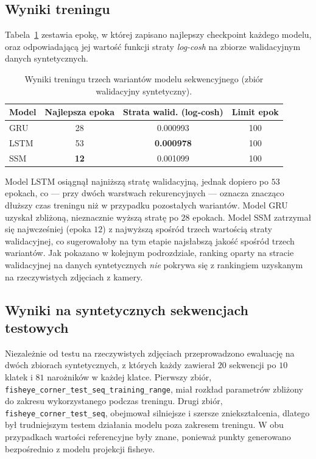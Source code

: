 \subsection{Wyniki treningu}
\label{sec:wyniki-treningu}

Tabela~\ref{tab:wyniki-treningu} zestawia epokę, w której zapisano najlepszy
checkpoint każdego modelu, oraz odpowiadającą jej wartość funkcji straty
\emph{log-cosh} na zbiorze walidacyjnym danych syntetycznych.

\begin{table}[htbp]
  \centering
  \begin{tabular}{@{}lccc@{}}
    \toprule
    \textbf{Model} & \textbf{Najlepsza epoka} & \textbf{Strata walid. (log-cosh)} & \textbf{Limit epok} \\
    \midrule
    GRU  & 28 & 0.000993 & 100 \\
    LSTM & 53 & \textbf{0.000978} & 100 \\
    SSM  & \textbf{12} & 0.001099 & 100 \\
    \bottomrule
  \end{tabular}
  \caption{Wyniki treningu trzech wariantów modelu sekwencyjnego (zbiór walidacyjny syntetyczny).}
  \label{tab:wyniki-treningu}
\end{table}

Model LSTM osiągnął najniższą stratę walidacyjną, jednak dopiero po $53$
epokach, co --- przy dwóch warstwach rekurencyjnych --- oznacza znacząco
dłuższy czas treningu niż w przypadku pozostałych wariantów. Model GRU
uzyskał zbliżoną, nieznacznie wyższą stratę po $28$ epokach. Model SSM
zatrzymał się najwcześniej (epoka $12$) z najwyższą spośród trzech wartością
straty walidacyjnej, co sugerowałoby na tym etapie najsłabszą jakość spośród
trzech wariantów. Jak pokazano w kolejnym podrozdziale, ranking oparty na
stracie walidacyjnej na danych syntetycznych \emph{nie} pokrywa się z
rankingiem uzyskanym na rzeczywistych zdjęciach z kamery.

\subsection{Wyniki na syntetycznych sekwencjach testowych}
\label{sec:wyniki-syntetyczne-sekwencje}

Niezależnie od testu na rzeczywistych zdjęciach przeprowadzono ewaluację na
dwóch zbiorach syntetycznych, z których każdy zawierał $20$ sekwencji po
$10$ klatek i $81$ narożników w każdej klatce. Pierwszy zbiór,
\texttt{fisheye\_corner\_test\_seq\_training\_range}, miał rozkład
parametrów zbliżony do zakresu wykorzystanego podczas treningu. Drugi zbiór,
\texttt{fisheye\_corner\_test\_seq}, obejmował silniejsze i szersze
zniekształcenia, dlatego był trudniejszym testem działania modelu poza zakresem treningu. W obu przypadkach
wartości referencyjne były znane, ponieważ punkty generowano bezpośrednio z
modelu projekcji fisheye.

